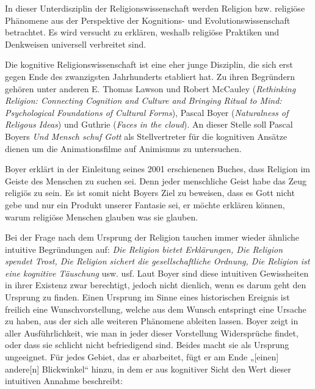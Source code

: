 In dieser Unterdisziplin der Religionswissenschaft werden Religion bzw. religiöse Phänomene aus der Perspektive der Kognitions- und Evolutionswissenschaft betrachtet. Es wird versucht zu erklären, weshalb religiöse Praktiken und Denkweisen universell verbreitet sind.

Die kognitive Religionswissenschaft ist eine eher junge Disziplin, die sich erst gegen Ende des zwanzigsten Jahrhunderts etabliert hat. Zu ihren Begründern gehören unter anderen E. Thomas Lawson und Robert McCauley (\emph{Rethinking Religion: Connecting Cognition and Culture and Bringing Ritual to Mind: Psychological Foundations of Cultural Forms}), Pascal Boyer (\emph{Naturalness of Religous Ideas}) und Guthrie (\emph{Faces in the cloud}). An dieser Stelle soll Pascal Boyers \emph{Und Mensch schuf Gott} als Stellvertreter für die kognitiven Ansätze dienen um die Animationsfilme auf Animismus zu untersuchen.

Boyer erklärt in der Einleitung seines 2001 erschienenen Buches, dass Religion im Geiste des Menschen zu suchen sei. Denn jeder menschliche Geist habe das Zeug religiös zu sein. Es ist somit nicht Boyers Ziel zu beweisen, dass es Gott nicht gebe und nur ein Produkt unserer Fantasie sei, er möchte erklären können, warum religiöse Menschen glauben was sie glauben.

Bei der Frage nach dem Ursprung der Religion tauchen immer wieder ähnliche intuitive Begründungen auf: \emph{Die Religion bietet Erklärungen, Die Religion spendet Trost, Die Religion sichert die gesellschaftliche Ordnung, Die Religion ist eine kognitive Täuschung} usw. usf. Laut Boyer sind diese intuitiven Gewissheiten in ihrer Existenz zwar berechtigt, jedoch nicht dienlich, wenn es darum geht den Ursprung zu finden. Einen Ursprung im Sinne eines historischen Ereignis ist freilich eine Wunschvorstellung, welche aus dem Wunsch entspringt eine Ursache zu haben, aus der sich alle weiteren Phänomene ableiten lassen. Boyer zeigt in aller Ausführlichkeit, wie man in jeder dieser Vorstellung Widersprüche findet, oder dass sie schlicht nicht befriedigend sind. Beides macht sie als Ursprung ungeeignet. Für jedes Gebiet, das er abarbeitet, fügt er am Ende „[einen] andere[n] Blickwinkel“ hinzu, in dem er aus kognitiver Sicht den Wert dieser intuitiven Annahme beschreibt: 

